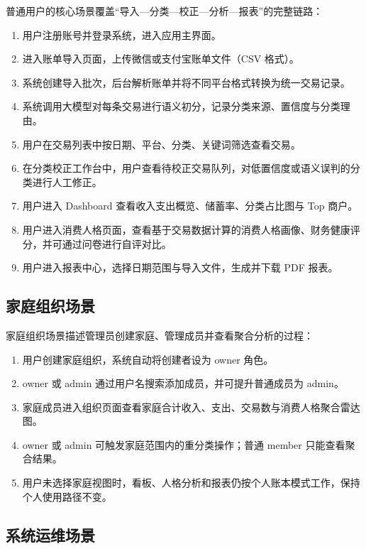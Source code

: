 普通用户的核心场景覆盖“导入—分类—校正—分析—报表”的完整链路：

\begin{enumerate}
  \item 用户注册账号并登录系统，进入应用主界面。
  \item 进入账单导入页面，上传微信或支付宝账单文件（CSV 格式）。
  \item 系统创建导入批次，后台解析账单并将不同平台格式转换为统一交易记录。
  \item 系统调用大模型对每条交易进行语义初分，记录分类来源、置信度与分类理由。
  \item 用户在交易列表中按日期、平台、分类、关键词筛选查看交易。
  \item 在分类校正工作台中，用户查看待校正交易队列，对低置信度或语义误判的分类进行人工修正。
  \item 用户进入 Dashboard 查看收入支出概览、储蓄率、分类占比图与 Top 商户。
  \item 用户进入消费人格页面，查看基于交易数据计算的消费人格画像、财务健康评分，并可通过问卷进行自评对比。
  \item 用户进入报表中心，选择日期范围与导入文件，生成并下载 PDF 报表。
\end{enumerate}

\subsection{家庭组织场景}

家庭组织场景描述管理员创建家庭、管理成员并查看聚合分析的过程：

\begin{enumerate}
  \item 用户创建家庭组织，系统自动将创建者设为 owner 角色。
  \item owner 或 admin 通过用户名搜索添加成员，并可提升普通成员为 admin。
  \item 家庭成员进入组织页面查看家庭合计收入、支出、交易数与消费人格聚合雷达图。
  \item owner 或 admin 可触发家庭范围内的重分类操作；普通 member 只能查看聚合结果。
  \item 用户未选择家庭视图时，看板、人格分析和报表仍按个人账本模式工作，保持个人使用路径不变。
\end{enumerate}

\subsection{系统运维场景}


